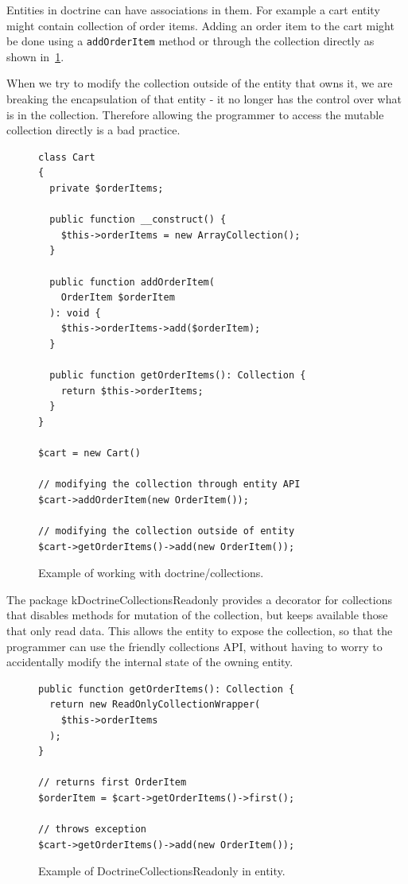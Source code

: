  \label{sec:state:doctrine-collections-readonly}

Entities in \gls{doctrine} can have associations in them. For example a cart entity might contain collection of order items. Adding an order item to the cart might be done using a \lstinline{addOrderItem} method or through the collection directly as shown in~\ref{fig:collections-readonly:example}.

When we try to modify the collection outside of the entity that owns it, we are breaking the encapsulation of that entity - it no longer has the control over what is in the collection. Therefore allowing the programmer to access the mutable collection directly is a bad practice.

\begin{figure} \label{fig:collections-readonly:example}
\begin{lstlisting}
class Cart
{
  private $orderItems;

  public function __construct() {
    $this->orderItems = new ArrayCollection();
  }

  public function addOrderItem(
    OrderItem $orderItem
  ): void {
    $this->orderItems->add($orderItem);
  }

  public function getOrderItems(): Collection {
    return $this->orderItems;
  }
}

$cart = new Cart()

// modifying the collection through entity API
$cart->addOrderItem(new OrderItem());

// modifying the collection outside of entity
$cart->getOrderItems()->add(new OrderItem());
\end{lstlisting}
\caption{Example of working with doctrine/collections.}
\end{figure}

The package \gls{kDoctrineCollectionsReadonly} provides a decorator for collections that disables methods for mutation of the collection, but keeps available those that only read data. This allows the entity to expose the collection, so that the programmer can use the friendly collections API, without having to worry to accidentally modify the internal state of the owning entity.

\begin{figure} \label{fig:collections-readonly:readonly}
\begin{lstlisting}
public function getOrderItems(): Collection {
  return new ReadOnlyCollectionWrapper(
    $this->orderItems
  );
}

// returns first OrderItem
$orderItem = $cart->getOrderItems()->first();

// throws exception
$cart->getOrderItems()->add(new OrderItem());
\end{lstlisting}
\caption{Example of DoctrineCollectionsReadonly in entity.}
\end{figure}

